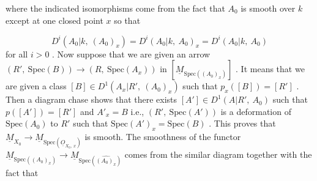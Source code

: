 where the indicated isomorphisms come from the fact that  $A_0$  is smooth over  $k$  except at one closed point  $x$  so that

$$D^i(A_0|k,\ (A_0)_x) = D^i(A_0|k,\ A_0)_x = D^i(A_0|k,\ A_0)$$
for all  $i > 0$ . Now suppose that we are given an arrow $(R',\ \mathrm{Spec}(B)) \to (R,\ \mathrm{Spec}(A_x))$  in  $[\underline{M}_{\mathrm{Spec}((A_0)_x)}]$ . It means that we are given a class $[B] \in D^1(A_x|R',\ (A_0)_x)$  such that  $p_x([B]) = [R']$ . Then a diagram chase shows that there exists $[A'] \in D^1(A|R',\ A_0)$  such that $p([A']) = [R']$  and  $A'_x = B$  i.e.,  $(R',\ \mathrm{Spec}(A'))$  is a deformation of  $\mathrm{Spec}(A_0)$ to  $R'$  such that  $\mathrm{Spec}(A')_x = \mathrm{Spec}(B)$ . This proves that $\underline{M}_{X_0} \to \underline{M}_{\mathrm{Spec}(\underline{O}_{X_0,\ x})}$ is smooth. The smoothness of the functor  $\underline{M}_{\mathrm{Spec}((A_0)_x)} \to \underline{M}_{\mathrm{Spec}(\widehat{(A_0)_x})}$ comes from the similar diagram together with the fact that

